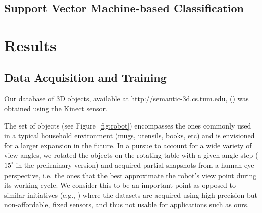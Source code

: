 \documentclass[conference]{sty/IEEEtran}
\begin{document}
\subsection{Support Vector Machine-based Classification}

\section{Results}
\label{sec:results}
\subsection{Data Acquisition and Training}
Our database of 3D objects, available at \url{http://semantic-3d.cs.tum.edu},
() was obtained using the Kinect sensor.

The set of objects (see Figure~\ref{fig:robot}) encompasses the ones commonly used
in a typical household environment (mugs, utensils, books, etc) and is envisioned for a
larger expansion in the future.  In a pursue to account for a wide variety
of view angles, we rotated the objects on the rotating table with a given
angle-step ($15^\circ$ in the preliminary version) and acquired partial
snapshots from a human-eye perspective, i.e. the ones that the best
approximate the robot's view point during its working cycle.  We consider
this to be an important point as opposed to similar initiatives (e.g.,
\cite{kit}) where the datasets are acquired using high-precision but
non-affordable, fixed sensors, and thus not usable for applications such as ours.
\end{document}
